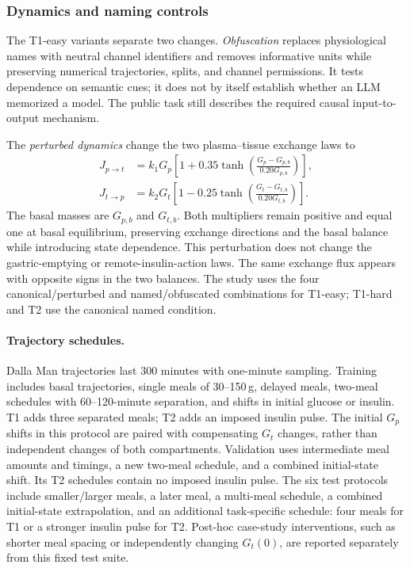 \subsubsection{Dynamics and naming controls}
\label{app:benchmark_controls}

The T1-easy variants separate two changes. \emph{Obfuscation} replaces
physiological names with neutral channel identifiers and removes informative
units while preserving numerical trajectories, splits, and channel permissions.
It tests dependence on semantic cues; it does not by itself establish whether
an LLM memorized a model. The public task still describes the required causal
input-to-output mechanism.

The \emph{perturbed dynamics} change the two plasma--tissue exchange laws to
\begin{align}
J_{p\to t}
&= k_1G_p\left[1+0.35\tanh\!\left(
\frac{G_p-G_{p,b}}{0.20G_{p,b}}\right)\right], \\
J_{t\to p}
&= k_2G_t\left[1-0.25\tanh\!\left(
\frac{G_t-G_{t,b}}{0.20G_{t,b}}\right)\right].
\end{align}
The basal masses are $G_{p,b}$ and $G_{t,b}$. Both multipliers remain positive
and equal one at basal equilibrium, preserving exchange directions and the
basal balance while introducing state dependence. This perturbation does not
change the gastric-emptying or remote-insulin-action laws. The same exchange
flux appears with opposite signs in the two balances. The study uses the four
canonical/perturbed and named/obfuscated combinations for T1-easy; T1-hard and
T2 use the canonical named condition.

\paragraph{Trajectory schedules.}
Dalla Man trajectories last 300 minutes with one-minute sampling. Training
includes basal trajectories, single meals of 30--150\,g, delayed meals,
two-meal schedules with 60--120-minute separation, and shifts in initial glucose
or insulin. T1 adds three separated meals; T2 adds an imposed insulin pulse.
The initial $G_p$ shifts in this protocol are paired with compensating $G_t$
changes, rather than independent changes of both compartments.
Validation uses intermediate meal amounts and timings, a new two-meal schedule,
and a combined initial-state shift. Its T2 schedules contain no imposed insulin
pulse. The six test protocols include smaller/larger meals, a later meal,
a multi-meal schedule, a combined initial-state extrapolation, and an additional
task-specific schedule: four meals for T1 or a stronger insulin pulse for T2.
Post-hoc case-study interventions, such as shorter meal spacing or independently
changing $G_t(0)$, are reported separately from this fixed test suite.

